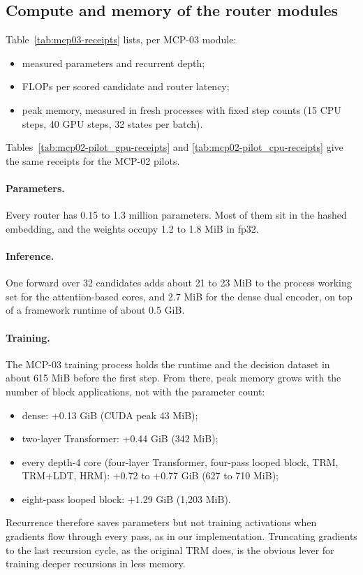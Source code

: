 \subsection{Compute and memory of the router modules}
Table~\ref{tab:mcp03-receipts} lists, per MCP-03 module:
\begin{itemize}
\item measured parameters and recurrent depth;
\item FLOPs per scored candidate and router latency;
\item peak memory, measured in fresh processes with fixed step counts (15 CPU steps, 40 GPU steps, 32 states per batch).
\end{itemize}
Tables~\ref{tab:mcp02-pilot_gpu-receipts} and \ref{tab:mcp02-pilot_cpu-receipts} give the same receipts for the MCP-02 pilots.

\paragraph{Parameters.} Every router has 0.15 to 1.3 million parameters. Most of them sit in the hashed embedding, and the weights
occupy 1.2 to 1.8 MiB in fp32.

\paragraph{Inference.} One forward over 32 candidates adds about 21 to 23 MiB to the process working set for the
attention-based cores, and 2.7 MiB for the dense dual encoder, on top of a framework runtime of about 0.5 GiB.

\paragraph{Training.} The MCP-03 training process holds the runtime and the decision dataset in about 615 MiB before
the first step. From there, peak memory grows with the number of block applications, not with the parameter count:
\begin{itemize}
\item dense: +0.13 GiB (CUDA peak 43 MiB);
\item two-layer Transformer: +0.44 GiB (342 MiB);
\item every depth-4 core (four-layer Transformer, four-pass looped block, TRM, TRM+LDT, HRM): +0.72 to +0.77 GiB
(627 to 710 MiB);
\item eight-pass looped block: +1.29 GiB (1,203 MiB).
\end{itemize}
Recurrence therefore saves parameters but not training activations when gradients flow through every pass, as in
our implementation. Truncating gradients to the last recursion cycle, as the original TRM does, is the obvious lever
for training deeper recursions in less memory.

